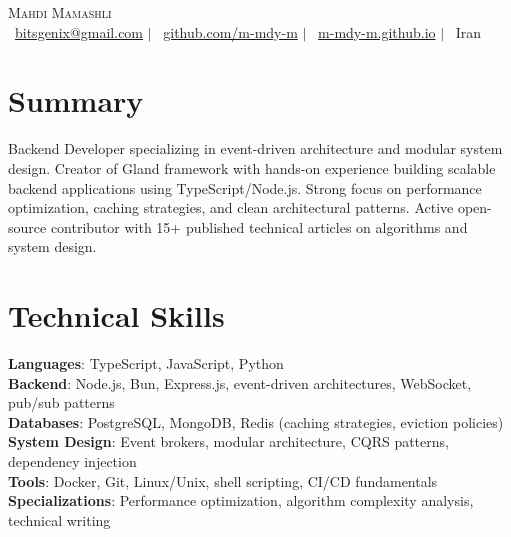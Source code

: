 \documentclass[letterpaper,10pt]{article}
\begin{document}
	
	\begin{center}
		{\Huge \scshape Mahdi Mamashli} \\ \vspace{5pt}
		\small 
		\faEnvelope\ \href{mailto:bitsgenix@gmail.com}{bitsgenix@gmail.com} $|$ 
		\faGithub\ \href{https://github.com/m-mdy-m}{github.com/m-mdy-m} $|$
		\faGlobe\ \href{https://m-mdy-m.github.io/}{m-mdy-m.github.io} $|$
		\faMapMarker\ Iran
		\vspace{-5pt}
	\end{center}
	
	\section{Summary}
	\small{Backend Developer specializing in event-driven architecture and modular system design. Creator of Gland framework with hands-on experience building scalable backend applications using TypeScript/Node.js. Strong focus on performance optimization, caching strategies, and clean architectural patterns. Active open-source contributor with 15+ published technical articles on algorithms and system design.}
	\vspace{-4pt}
	
	\section{Technical Skills}
	\begin{itemize}[leftmargin=0.12in, label={}]
		\small{\item{
				\textbf{Languages}: TypeScript, JavaScript, Python \\
				\textbf{Backend}: Node.js, Bun, Express.js, event-driven architectures, WebSocket, pub/sub patterns \\
				\textbf{Databases}: PostgreSQL, MongoDB, Redis (caching strategies, eviction policies) \\
				\textbf{System Design}: Event brokers, modular architecture, CQRS patterns, dependency injection \\
				\textbf{Tools}: Docker, Git, Linux/Unix, shell scripting, CI/CD fundamentals \\
				\textbf{Specializations}: Performance optimization, algorithm complexity analysis, technical writing
		}}
	\end{itemize}
	\vspace{-8pt}
	
\end{document}
